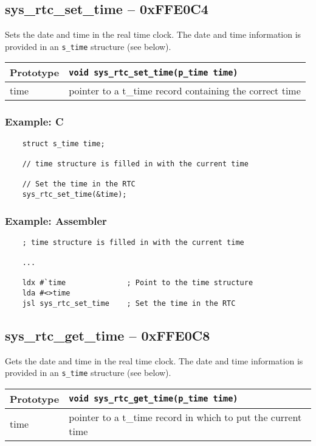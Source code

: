 \subsection*{sys\_rtc\_set\_time -- 0xFFE0C4}
Sets the date and time in the real time clock. The date and time information is provided in an \verb+s_time+ structure (see below).

\bigskip

\begin{tabular}{|l||l|} \hline
Prototype & \lstinline!void sys_rtc_set_time(p_time time)! \\ \hline
time & pointer to a t\_time record containing the correct time \\ \hline
\end{tabular}

\subsubsection*{Example: C}
\begin{lstlisting}
    struct s_time time;
    
    // time structure is filled in with the current time

    // Set the time in the RTC
    sys_rtc_set_time(&time);
\end{lstlisting}

\subsubsection*{Example: Assembler}
\begin{verbatim}
    ; time structure is filled in with the current time

    ...

    ldx #`time              ; Point to the time structure
    lda #<>time
    jsl sys_rtc_set_time    ; Set the time in the RTC
\end{verbatim}


\subsection*{sys\_rtc\_get\_time -- 0xFFE0C8}
Gets the date and time in the real time clock. The date and time information is provided in an \verb+s_time+ structure (see below).

\bigskip

\begin{tabular}{|l||l|} \hline
Prototype & \lstinline!void sys_rtc_get_time(p_time time)! \\ \hline
time & pointer to a t\_time record in which to put the current time \\ \hline
\end{tabular}

